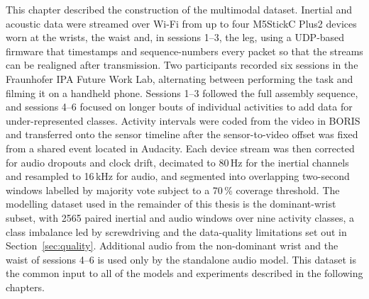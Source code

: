 This chapter described the construction of the multimodal dataset. Inertial and
acoustic data were streamed over Wi-Fi from up to four M5StickC Plus2 devices worn
at the wrists, the waist and, in sessions 1--3, the leg, using a UDP-based firmware
that timestamps and sequence-numbers every packet so that the streams can be
realigned after transmission. Two participants recorded six sessions in the
Fraunhofer IPA Future Work Lab, alternating between performing the task and
filming it on a handheld phone. Sessions 1--3 followed the full assembly sequence,
and sessions 4--6 focused on longer bouts of individual activities to add data for
under-represented classes. Activity intervals were coded from the video in BORIS
and transferred onto the sensor timeline after the sensor-to-video offset was
fixed from a shared event located in Audacity. Each device stream was then
corrected for audio dropouts and clock drift, decimated to 80\,Hz for the inertial
channels and resampled to 16\,kHz for audio, and segmented into overlapping
two-second windows labelled by majority vote subject to a 70\,\% coverage
threshold. The modelling dataset used in the remainder of this thesis is the
dominant-wrist subset, with 2565 paired inertial and audio windows over nine
activity classes, a class imbalance led by screwdriving and the data-quality
limitations set out in Section~\ref{sec:quality}. Additional audio from the
non-dominant wrist and the waist of sessions 4--6 is used only by the standalone
audio model. This dataset is the common input to all of the models and
experiments described in the following chapters.
